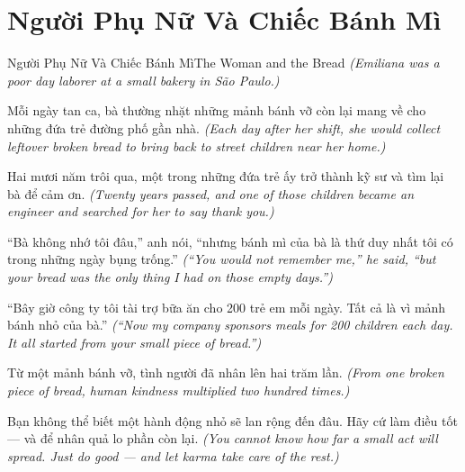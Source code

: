 \section{Người Phụ Nữ Và Chiếc Bánh Mì}
\begin{truyen}{Người Phụ Nữ Và Chiếc Bánh Mì}{The Woman and the Bread}
\textit{(Emiliana was a poor day laborer at a small bakery in São Paulo.)}

Mỗi ngày tan ca, bà thường nhặt những mảnh bánh vỡ còn lại mang về cho những đứa trẻ đường phố gần nhà.
\textit{(Each day after her shift, she would collect leftover broken bread to bring back to street children near her home.)}

Hai mươi năm trôi qua, một trong những đứa trẻ ấy trở thành kỹ sư và tìm lại bà để cảm ơn.
\textit{(Twenty years passed, and one of those children became an engineer and searched for her to say thank you.)}

``Bà không nhớ tôi đâu,'' anh nói, ``nhưng bánh mì của bà là thứ duy nhất tôi có trong những ngày bụng trống.''
\textit{(``You would not remember me,'' he said, ``but your bread was the only thing I had on those empty days.'')}

``Bây giờ công ty tôi tài trợ bữa ăn cho 200 trẻ em mỗi ngày. Tất cả là vì mảnh bánh nhỏ của bà.''
\textit{(``Now my company sponsors meals for 200 children each day. It all started from your small piece of bread.'')}

Từ một mảnh bánh vỡ, tình người đã nhân lên hai trăm lần.
\textit{(From one broken piece of bread, human kindness multiplied two hundred times.)}

\end{truyen}

\begin{baihoc}
Bạn không thể biết một hành động nhỏ sẽ lan rộng đến đâu. Hãy cứ làm điều tốt — và để nhân quả lo phần còn lại.
\textit{(You cannot know how far a small act will spread. Just do good — and let karma take care of the rest.)}
\end{baihoc}
\ngancach


